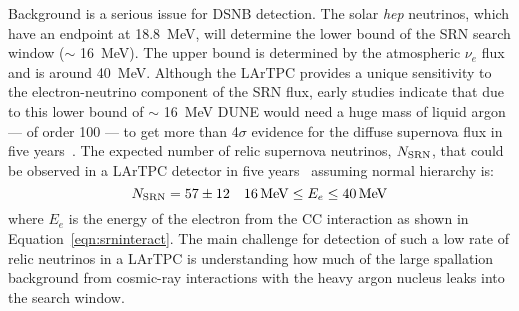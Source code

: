 Background is a serious issue for DSNB detection.
The solar {\em hep} neutrinos, which have an                
endpoint at \SI{18.8}{\MeV}, will determine the lower bound of the SRN
search window ($\sim$ \SI{16}{\MeV}).  The upper bound is determined
by the atmospheric ${\nu}_{e}$ flux and
is around \SI{40}{MeV}.
Although the LArTPC provides a unique sensitivity to the
electron-neutrino component of the SRN flux, early studies indicate
that due to this lower bound of $\sim$ \SI{16}{\MeV} DUNE would need a huge
mass of liquid argon --- of order \SI{100}{\kt} --- to get more than 4$\sigma$
evidence for the diffuse supernova flux in five
years~\cite{Cocco:2004ac}.
%
The expected number of relic
supernova neutrinos, $N_{\rm SRN}$, that could be observed in a
 LArTPC detector in five years~\cite{Cocco:2004ac}
assuming normal hierarchy is:
\begin{equation}
N_{\rm SRN} = 57 \pm 12  \ \ \ 16 \, {\rm MeV} \leq E_e \leq 40 \, {\rm MeV}
\label{eqn:srnrate}
\end{equation}
where $E_e$ is the energy of the electron from the CC interaction as
shown in Equation~\ref{eqn:srninteract}. 
 The main challenge for detection of such
a low rate of relic neutrinos in a LArTPC is understanding how much of
the large spallation background from cosmic-ray interactions with the
heavy argon nucleus 
leaks into the search window. 

